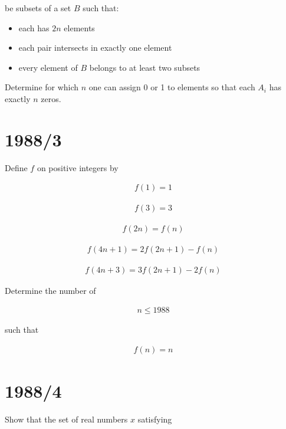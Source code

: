 \documentclass[12pt]{article}
\begin{document}
be subsets of a set $B$ such that:

\begin{itemize}

\item each has $2n$ elements

\item each pair intersects in exactly one element

\item every element of $B$ belongs to at least two subsets

\end{itemize}

Determine for which $n$ one can assign 0 or 1 to elements so that each $A_i$ has exactly $n$ zeros.

\section*{1988/3}

Define $f$ on positive integers by

\begin{align*}
f(1)=1
\end{align*}

\begin{align*}
f(3)=3
\end{align*}

\begin{align*}
f(2n)=f(n)
\end{align*}

\begin{align*}
f(4n+1)=2f(2n+1)-f(n)
\end{align*}

\begin{align*}
f(4n+3)=3f(2n+1)-2f(n)
\end{align*}

Determine the number of

\begin{align*}
n\leq1988
\end{align*}

such that

\begin{align*}
f(n)=n
\end{align*}

\section*{1988/4}

Show that the set of real numbers $x$ satisfying
\end{document}
